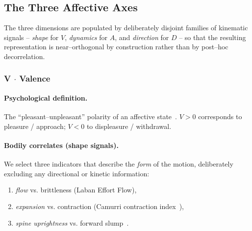 
\subsection{The Three Affective Axes}
\label{sec:vad-axes}

The three dimensions are populated by deliberately disjoint families of
kinematic signals -- \emph{shape} for $V$, \emph{dynamics} for $A$, and
\emph{direction} for $D$ -- so that the resulting representation is
near--orthogonal by construction rather than by post--hoc decorrelation.

\subsubsection*{V $\cdot$ Valence}

\paragraph{Psychological definition.}
The ``pleasant--unpleasant'' polarity of an affective
state~\cite{russell1980circumplex,mehrabian1996pad}. $V>0$ corresponds to
pleasure / approach; $V<0$ to displeasure / withdrawal.

\paragraph{Bodily correlates (shape signals).}
We select three indicators that describe the \emph{form} of the motion,
deliberately excluding any directional or kinetic information:
\begin{enumerate}\itemsep1pt
  \item \emph{flow} vs. brittleness (Laban Effort\,\textperiodcentered\,Flow),
  \item \emph{expansion} vs. contraction (Camurri contraction
        index~\cite{camurri2003recognizing}),
  \item \emph{spine uprightness} vs. forward slump~\cite{boone2001children}.
\end{enumerate}

